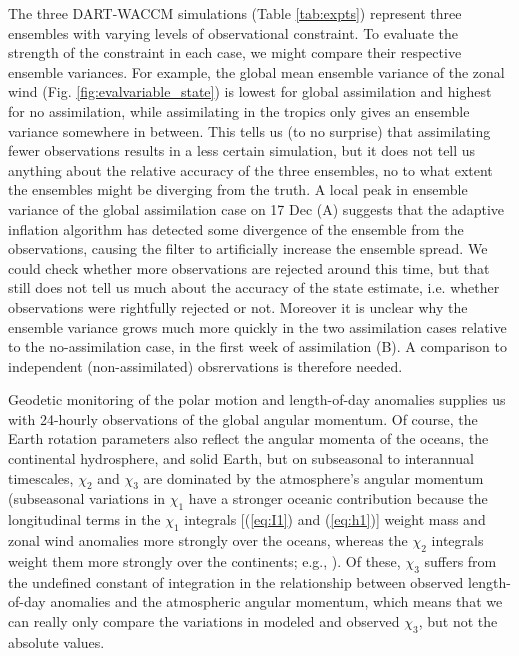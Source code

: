 The three DART-WACCM simulations (Table \ref{tab:expts}) represent three ensembles with varying levels of observational constraint. 
To evaluate the strength of the constraint in each case, we might compare their respective ensemble variances. 
For example, the global mean ensemble variance of the zonal wind (Fig. \ref{fig:evalvariable_state}) 
is lowest for global assimilation and highest for no assimilation, while assimilating in the tropics only gives an ensemble variance somewhere in between.
This tells us (to no surprise) that assimilating fewer observations results in a less certain simulation, but it 
does not tell us anything about the relative accuracy of the three ensembles, no to what extent the ensembles might be diverging from the truth. 
A local peak in ensemble variance of the global assimilation case on 17 Dec (A) suggests that the adaptive inflation algorithm has detected some divergence of the ensemble from the observations, causing the filter to artificially increase the ensemble spread. 
We could check whether more observations are rejected around this time, but that still does not tell us much about the accuracy of the state estimate, i.e. whether observations were rightfully rejected or not. 
Moreover it is unclear why the ensemble variance grows much more quickly in the two assimilation cases relative to the no-assimilation case, in the first week of assimilation (B).   
A comparison to independent (non-assimilated) obsrervations is therefore needed. 

Geodetic monitoring of the polar motion and length-of-day anomalies
supplies us with 24-hourly observations of the global
angular momentum.
Of course, the Earth rotation parameters also reflect the angular momenta of the oceans, the continental hydrosphere, and solid Earth, but on subseasonal to interannual timescales, $\chi_2$ and $\chi_3$ are dominated by the atmosphere's angular momentum 
(subseasonal variations in $\chi_1$ have a stronger oceanic contribution 
because the 
longitudinal terms in the $\chi_1$ integrals [(\ref{eq:I1}) and (\ref{eq:h1})] weight mass and zonal wind anomalies more strongly over the oceans, whereas the $\chi_2$ integrals weight them more strongly over the continents; e.g., \citet{Neef2012}).
Of these, $\chi_3$ 
suffers from the undefined constant of integration in the relationship between observed length-of-day anomalies and the atmospheric angular momentum, which means that
we can really only compare the variations in modeled and observed $\chi_3$, but not the absolute values. 


